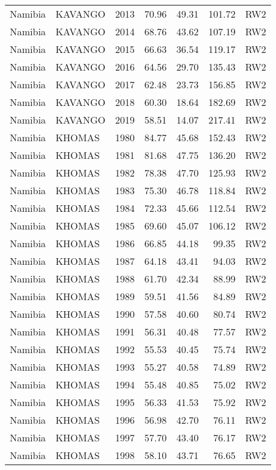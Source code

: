 \begin{longtable}{lllrrrl}
  Namibia & KAVANGO & 2013 & 70.96 & 49.31 & 101.72 & RW2 \\ 
  Namibia & KAVANGO & 2014 & 68.76 & 43.62 & 107.19 & RW2 \\ 
  Namibia & KAVANGO & 2015 & 66.63 & 36.54 & 119.17 & RW2 \\ 
  Namibia & KAVANGO & 2016 & 64.56 & 29.70 & 135.43 & RW2 \\ 
  Namibia & KAVANGO & 2017 & 62.48 & 23.73 & 156.85 & RW2 \\ 
  Namibia & KAVANGO & 2018 & 60.30 & 18.64 & 182.69 & RW2 \\ 
  Namibia & KAVANGO & 2019 & 58.51 & 14.07 & 217.41 & RW2 \\ 
  Namibia & KHOMAS & 1980 & 84.77 & 45.68 & 152.43 & RW2 \\ 
  Namibia & KHOMAS & 1981 & 81.68 & 47.75 & 136.20 & RW2 \\ 
  Namibia & KHOMAS & 1982 & 78.38 & 47.70 & 125.93 & RW2 \\ 
  Namibia & KHOMAS & 1983 & 75.30 & 46.78 & 118.84 & RW2 \\ 
  Namibia & KHOMAS & 1984 & 72.33 & 45.66 & 112.54 & RW2 \\ 
  Namibia & KHOMAS & 1985 & 69.60 & 45.07 & 106.12 & RW2 \\ 
  Namibia & KHOMAS & 1986 & 66.85 & 44.18 & 99.35 & RW2 \\ 
  Namibia & KHOMAS & 1987 & 64.18 & 43.41 & 94.03 & RW2 \\ 
  Namibia & KHOMAS & 1988 & 61.70 & 42.34 & 88.99 & RW2 \\ 
  Namibia & KHOMAS & 1989 & 59.51 & 41.56 & 84.89 & RW2 \\ 
  Namibia & KHOMAS & 1990 & 57.58 & 40.60 & 80.74 & RW2 \\ 
  Namibia & KHOMAS & 1991 & 56.31 & 40.48 & 77.57 & RW2 \\ 
  Namibia & KHOMAS & 1992 & 55.53 & 40.45 & 75.74 & RW2 \\ 
  Namibia & KHOMAS & 1993 & 55.27 & 40.58 & 74.89 & RW2 \\ 
  Namibia & KHOMAS & 1994 & 55.48 & 40.85 & 75.02 & RW2 \\ 
  Namibia & KHOMAS & 1995 & 56.33 & 41.53 & 75.92 & RW2 \\ 
  Namibia & KHOMAS & 1996 & 56.98 & 42.70 & 76.11 & RW2 \\ 
  Namibia & KHOMAS & 1997 & 57.70 & 43.40 & 76.17 & RW2 \\ 
  Namibia & KHOMAS & 1998 & 58.10 & 43.71 & 76.65 & RW2 \\ 

\end{longtable}
